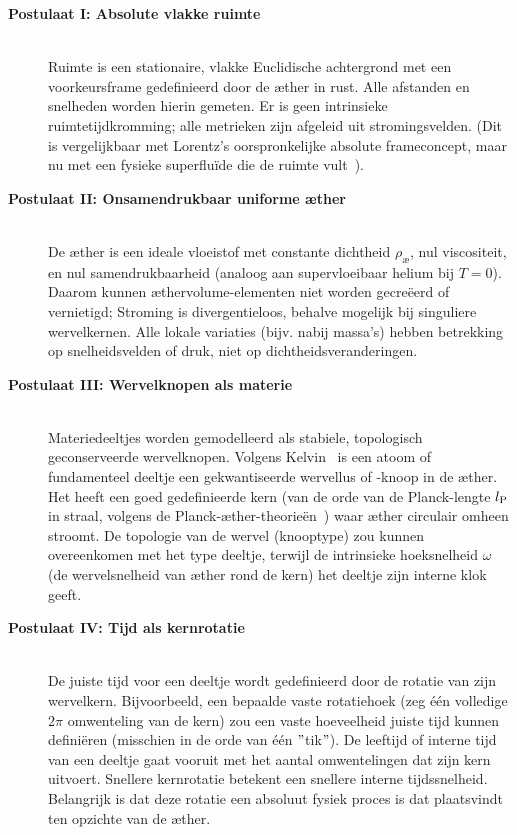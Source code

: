 \begin{description}

    \item[\textbf{Postulaat I: Absolute vlakke ruimte}] \hfill \\
    Ruimte is een stationaire, vlakke Euclidische achtergrond met een voorkeursframe gedefinieerd door de æther in rust. Alle afstanden en snelheden worden hierin gemeten. Er is geen intrinsieke ruimtetijdkromming; alle metrieken zijn afgeleid uit stromingsvelden. (Dit is vergelijkbaar met Lorentz's oorspronkelijke absolute frameconcept, maar nu met een fysieke superfluïde die de ruimte vult~\cite{Winterberg2002-PlanckÆther}).

    \item[\textbf{Postulaat II: Onsamendrukbaar uniforme æther}] \hfill \\
    De æther is een ideale vloeistof met constante dichtheid $\rho_\text{\ae}$, nul viscositeit, en nul samendrukbaarheid (analoog aan supervloeibaar
helium bij $T=0$). Daarom kunnen æthervolume-elementen niet worden gecreëerd of vernietigd; Stroming is divergentieloos, behalve mogelijk bij singuliere wervelkernen.  Alle lokale variaties (bijv. nabij massa's) hebben betrekking op snelheidsvelden of druk, niet op dichtheidsveranderingen.

    \item[\textbf{Postulaat III: Wervelknopen als materie}] \hfill \\
    Materiedeeltjes worden gemodelleerd als stabiele, topologisch geconserveerde wervelknopen. Volgens Kelvin~\cite{Kelvin1867-vortex} is een atoom of fundamenteel deeltje een gekwantiseerde wervellus of -knoop in de æther. Het heeft een goed gedefinieerde kern (van de orde van de Planck-lengte $l_{\textrm P}$ in straal, volgens de Planck-æther-theorieën~\cite{Winterberg2002-PlanckÆther}) waar æther circulair omheen stroomt. De topologie van de wervel (knooptype) zou kunnen overeenkomen met het type deeltje, terwijl de intrinsieke hoeksnelheid $\omega$ (de wervelsnelheid van æther rond de kern) het deeltje zijn interne klok geeft.

    \item[\textbf{Postulaat IV: Tijd als kernrotatie}] \hfill \\
    De juiste tijd voor een deeltje wordt gedefinieerd door de rotatie van zijn wervelkern. Bijvoorbeeld, een bepaalde vaste rotatiehoek (zeg één volledige $2\pi$ omwenteling van de kern) zou een vaste hoeveelheid juiste tijd kunnen definiëren (misschien in de orde van één \("\)tik\("\)). De leeftijd of interne tijd van een deeltje gaat vooruit met het aantal omwentelingen dat zijn kern uitvoert. Snellere kernrotatie betekent een snellere interne tijdssnelheid. Belangrijk is dat deze rotatie een absoluut fysiek proces is dat plaatsvindt ten opzichte van de æther.


\end{description}
